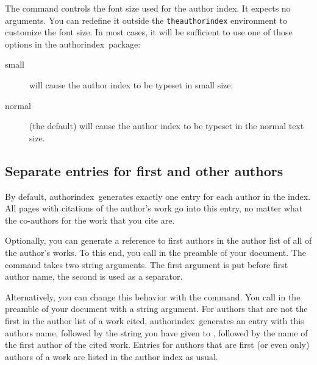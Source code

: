 \documentclass[a4paper]{article}
\newcommand{\package}[1]{\textsf{#1}}
\newcommand{\authorindex}{\package{authorindex}}
\newcommand{\ltxinp}[1]{\texttt{\string#1}}
\begin{document}
The command \ltxinp{\aisize} controls the font size used for the author index.
It expects no arguments. You can redefine it outside the
\ltxinp{theauthorindex} environment to customize the font size. In most cases,
it will be sufficient to use one of those options in the \authorindex\ package:
\begin{description}
\item[small] will cause the author index to be typeset in small size.
\item[normal] (the default) will cause the author index to be typeset in the
  normal text size.
\end{description}


\subsection{Separate entries for first and other authors}
\label{sec:firstandothers}

By default, \authorindex\ generates exactly one entry for each author in the
index.  All pages with citations of the author's work go into this entry, no
matter what the co-authors for the work that you cite are.

Optionally, you can generate a reference to first authors in the author list of
all of the author's works.  To this end, you call \ltxinp{\aialso} in the
preamble of your document.  The command takes two string arguments.  The first
argument is put before first author name, the second is used as a separator.

Alternatively, you can change this behavior with the \ltxinp{\aisee} command.
You call \ltxinp{\aisee} in the preamble of your document with a string
argument.  For authors that are not the first in the author list of a work
cited, \authorindex\ generates an entry with this authors name, followed by the
string you have given to \ltxinp{\aisee}, followed by the name of the first
author of the cited work.  Entries for authors that are first (or even only)
authors of a work are listed in the author index as usual.
\end{document}
